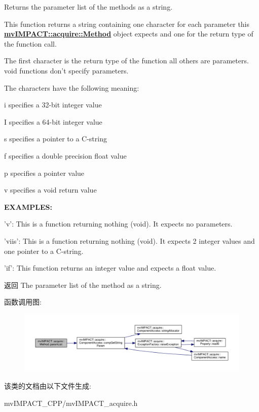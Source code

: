 Returns the parameter list of the methods as a string. 

This function returns a string containing one character for each parameter this {\bfseries \hyperlink{classmv_i_m_p_a_c_t_1_1acquire_1_1_method}{mv\+I\+M\+P\+A\+C\+T\+::acquire\+::\+Method}} object expects and one for the return type of the function call.

The first character is the return type of the function all others are parameters. void functions don't specify parameters.

The characters have the following meaning\+:
\begin{DoxyItemize}
\item i specifies a 32-\/bit integer value
\item I specifies a 64-\/bit integer value
\item s specifies a pointer to a C-\/string
\item f specifies a double precision float value
\item p specifies a pointer value
\item v specifies a void return value
\end{DoxyItemize}

{\bfseries E\+X\+A\+M\+P\+L\+E\+S\+:} 


\begin{DoxyItemize}
\item 'v'\+: This is a function returning nothing (void). It expects no parameters.
\item 'viis'\+: This is a function returning nothing (void). It expects 2 integer values and one pointer to a C-\/string.
\item 'if'\+: This function returns an integer value and expects a float value. \begin{DoxyReturn}{返回}
The parameter list of the method as a string. 
\end{DoxyReturn}

\end{DoxyItemize}

函数调用图\+:
\nopagebreak
\begin{figure}[H]
\begin{center}
\leavevmode
\includegraphics[width=350pt]{classmv_i_m_p_a_c_t_1_1acquire_1_1_method_ab938885a466ea43858e2709f7ba80b3f_cgraph}
\end{center}
\end{figure}




该类的文档由以下文件生成\+:\begin{DoxyCompactItemize}
\item 
mv\+I\+M\+P\+A\+C\+T\+\_\+\+C\+P\+P/mv\+I\+M\+P\+A\+C\+T\+\_\+acquire.\+h\end{DoxyCompactItemize}
